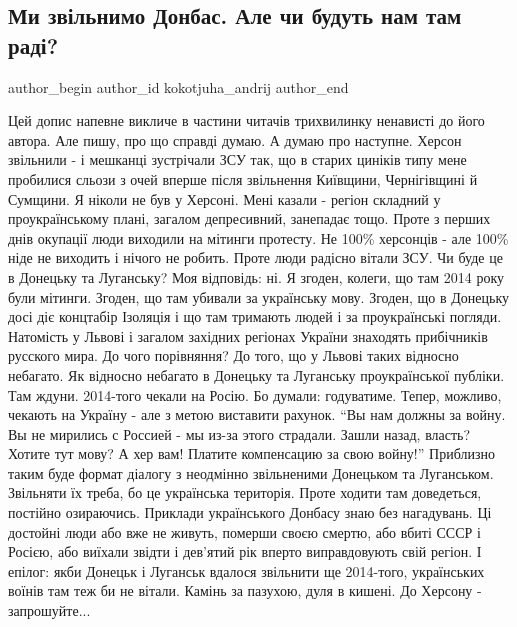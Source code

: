  
 
 
 
 
 
\subsection{Ми звільнимо Донбас. Але чи будуть нам там раді?}
\label{sec:12_11_2022.fb.kokotjuha_andrij.1.donbass_zvilnemo_nam_radi}
 
\ifcmt
 author_begin
   author_id kokotjuha_andrij
 author_end
\fi

Цей допис напевне викличе в частини читачів трихвилинку ненависті до його
автора. Але пишу, про що справді думаю. А думаю про наступне. Херсон звільнили
- і мешканці зустрічали ЗСУ так, що в старих циніків типу мене пробилися сльози
з очей вперше після звільнення Київщини, Чернігівщині й Сумщини. Я ніколи не
був у Херсоні. Мені казали - регіон складний у проукраїнському плані, загалом
депресивний, занепадає тощо. Проте з перших днів окупації люди виходили на
мітинги протесту. Не 100\% херсонців - але 100\% ніде не виходить і нічого не
робить. Проте люди радісно вітали ЗСУ. Чи буде це в Донецьку та Луганську? Моя
відповідь: ні. Я згоден, колеги, що там 2014 року були мітинги. Згоден, що там
убивали за українську мову. Згоден, що в Донецьку досі діє концтабір Ізоляція і
що там тримають людей і за проукраїнські погляди. Натомість у Львові і загалом
західних регіонах України знаходять прибічників русского мира. До чого
порівняння? До того, що у Львові таких відносно небагато. Як відносно небагато
в Донецьку та Луганську проукраїнської публіки. Там ждуни. 2014-того чекали на
Росію. Бо думали: годуватиме. Тепер, можливо, чекають на Україну - але з метою
виставити рахунок. \enquote{Вы нам должны за войну. Вы не мирились с Россией - мы из-за
этого страдали. Зашли назад, власть? Хотите тут мову? А хер вам! Платите
компенсацию за свою войну!} Приблизно таким буде формат діалогу з неодмінно
звільненими Донецьком та Луганськом. Звільняти їх треба, бо це українська
територія. Проте ходити там доведеться, постійно озираючись. Приклади
українського Донбасу знаю без нагадувань. Ці достойні люди або вже не живуть,
померши своєю смертю, або вбиті СССР і Росією, або виїхали звідти і дев'ятий
рік вперто виправдовують свій регіон. І епілог: якби Донецьк і Луганськ вдалося
звільнити ще 2014-того, українських воїнів там теж би не вітали. Камінь за
пазухою, дуля в кишені. До Херсону - запрошуйте...

